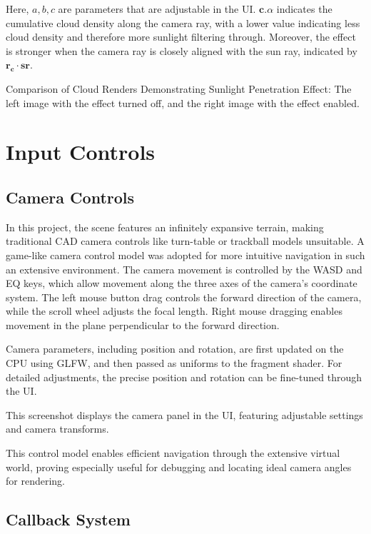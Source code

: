 Here, $a,b,c$ are parameters that are adjustable in the UI. $\mathbf{c}.\alpha$ indicates the cumulative cloud density along the camera ray, with a lower value indicating less cloud density and therefore more sunlight filtering through. Moreover, the effect is stronger when the camera ray is closely aligned with the sun ray, indicated by $\mathbf{r_c}\cdot \mathbf{sr}$.

{Comparison of Cloud Renders Demonstrating Sunlight Penetration Effect: The left image with the effect turned off, and the right image with the effect enabled.}


\section{Input Controls}

\subsection{Camera Controls}

In this project, the scene features an infinitely expansive terrain, making traditional CAD camera controls like turn-table or trackball models unsuitable. A game-like camera control model was adopted for more intuitive navigation in such an extensive environment. The camera movement is controlled by the WASD and EQ keys, which allow movement along the three axes of the camera's coordinate system. The left mouse button drag controls the forward direction of the camera, while the scroll wheel adjusts the focal length. Right mouse dragging enables movement in the plane perpendicular to the forward direction. 

Camera parameters, including position and rotation, are first updated on the CPU using GLFW, and then passed as uniforms to the fragment shader. For detailed adjustments, the precise position and rotation can be fine-tuned through the UI.

{This screenshot displays the camera panel in the UI, featuring adjustable settings and camera transforms.}

This control model enables efficient navigation through the extensive virtual world, proving especially useful for debugging and locating ideal camera angles for rendering.

\subsection{Callback System}

